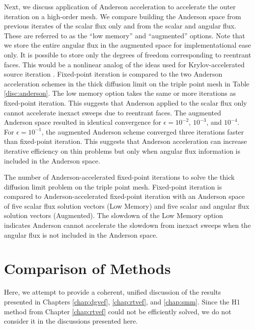 \documentclass[../doc.tex]{subfiles}
\begin{document}
Next, we discuss application of Anderson acceleration to accelerate the outer iteration on a high-order mesh. We compare building the Anderson space from previous iterates of the scalar flux only and from the scalar and angular flux. These are referred to as the ``low memory'' and ``augmented'' options. Note that we store the entire angular flux in the augmented space for implementational ease only. It is possible to store only the degrees of freedom corresponding to reentrant faces. This would be a nonlinear analog of the ideas used for Krylov-accelerated source iteration \cite{doi:10.13182/NSE02-14}. Fixed-point iteration is compared to the two Anderson acceleration schemes in the thick diffusion limit on the triple point mesh in Table \ref{disc:anderson}. The low memory option takes the same or more iterations as fixed-point iteration. This suggests that Anderson applied to the scalar flux only cannot accelerate inexact sweeps due to reentrant faces. The augmented Anderson space resulted in identical convergence for $\epsilon = 10^{-2}$, $10^{-3}$, and $10^{-4}$. For $\epsilon=10^{-1}$, the augmented Anderson scheme converged three iterations faster than fixed-point iteration. This suggests that Anderson acceleration can increase iterative efficiency on thin problems but only when angular flux information is included in the Anderson space. 

\begin{table}
\centering
\caption{The number of Anderson-accelerated fixed-point iterations to solve the thick diffusion limit problem on the triple point mesh. Fixed-point iteration is compared to Anderson-accelerated fixed-point iteration with an Anderson space of five scalar flux solution vectors (Low Memory) and five scalar and angular flux solution vectors (Augmented). The slowdown of the Low Memory option indicates Anderson cannot accelerate the slowdown from inexact sweeps when the angular flux is not included in the Anderson space. }
\label{disc:anderson}

\end{table}

\section{Comparison of Methods} \label{disc_sec:comparison}
Here, we attempt to provide a coherent, unified discussion of the results presented in Chapters \ref{chap:dgvef}, \ref{chap:rtvef}, and \ref{chap:smm}. Since the H1 method from Chapter \ref{chap:rtvef} could not be efficiently solved, we do not consider it in the discussions presented here. 
\end{document}
